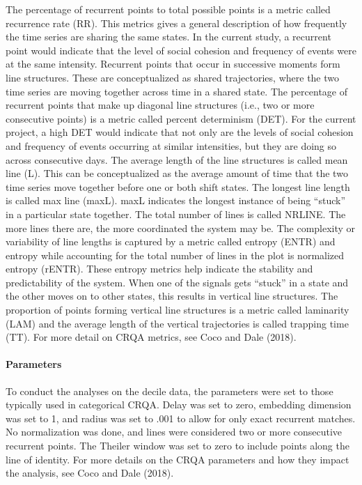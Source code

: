 \documentclass[english,man]{apa6}
\begin{document}
The percentage of recurrent points to total possible points is a metric called recurrence rate (RR). This metrics gives a general description of how frequently the time series are sharing the same states. In the current study, a recurrent point would indicate that the level of social cohesion and frequency of events were at the same intensity.
Recurrent points that occur in successive moments form line structures. These are conceptualized as shared trajectories, where the two time series are moving together across time in a shared state. The percentage of recurrent points that make up diagonal line structures (i.e., two or more consecutive points) is a metric called percent determinism (DET). For the current project, a high DET would indicate that not only are the levels of social cohesion and frequency of events occurring at similar intensities, but they are doing so across consecutive days.
The average length of the line structures is called mean line (L). This can be conceptualized as the average amount of time that the two time series move together before one or both shift states. The longest line length is called max line (maxL). maxL indicates the longest instance of being \enquote{stuck} in a particular state together. The total number of lines is called NRLINE. The more lines there are, the more coordinated the system may be. The complexity or variability of line lengths is captured by a metric called entropy (ENTR) and entropy while accounting for the total number of lines in the plot is normalized entropy (rENTR). These entropy metrics help indicate the stability and predictability of the system. When one of the signals gets \enquote{stuck} in a state and the other moves on to other states, this results in vertical line structures. The proportion of points forming vertical line structures is a metric called laminarity (LAM) and the average length of the vertical trajectories is called trapping time (TT). For more detail on CRQA metrics, see Coco and Dale (2018).

\hypertarget{parameters}{%
\paragraph{Parameters}\label{parameters}}

To conduct the analyses on the decile data, the parameters were set to those typically used in categorical CRQA. Delay was set to zero, embedding dimension was set to 1, and radius was set to .001 to allow for only exact recurrent matches. No normalization was done, and lines were considered two or more consecutive recurrent points. The Theiler window was set to zero to include points along the line of identity. For more details on the CRQA parameters and how they impact the analysis, see Coco and Dale (2018).
\end{document}
